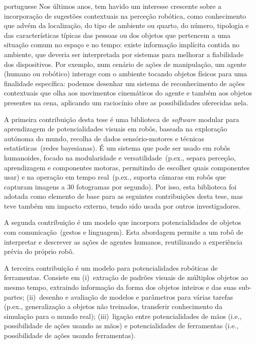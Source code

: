 \begin{otherlanguage*}{portuguese}
Nos últimos anos, tem havido um interesse crescente sobre a incorporação de sugestões contextuais na perceção robótica, como conhecimento que advém da localização, do tipo de ambiente ou quarto, do número, tipologia e das características típicas das pessoas ou dos objetos que pertencem a uma situação comum no espaço e no tempo: existe informação implícita contida no ambiente, que deveria ser interpretada por sistemas para melhorar a fiabilidade dos dispositivos.
Por exemplo, num cenário de ações de manipulação, um agente (humano ou robótico) interage com o ambiente tocando objetos físicos para uma finalidade específica: podemos desenhar um sistema de reconhecimento de ações contextuais que olha aos movimentos cinemáticos do agente e também aos objetos presentes na cena, aplicando um raciocínio obre as possibilidades oferecidas nela.

\bigskip

A primeira contribuição desta tese é uma biblioteca de \emph{software} modular para aprendizagem de potencialidades visuais em robôs, baseada na exploração autónoma do mundo, recolha de dados sensório-motores e técnicas estatísticas~(redes bayesianas).
É um sistema que pode ser usado em robôs humanoides, focado na modularidade e versatilidade~(p.ex., separa perceção, aprendizagem e componentes motoras, permitindo de escolher quais componentes usar) e na operação em tempo real~(p.ex., suporta câmaras em robôs que capturam imagens a 30 fotogramas por segundo).
Por isso, esta biblioteca foi adotada como elemento de base para as seguintes contribuições desta tese, mas teve também um impacto externo, tendo sido usada por outros investigadores.

A segunda contribuição é um modelo que incorpora potencialidades de objetos com comunicação~(gestos e linguagem).
Esta abordagem permite a um robô de interpretar e descrever as ações de agentes humanos, reutilizando a experiência prévia do próprio robô.

A terceira contribuição é um modelo para potencialidades robóticas de ferramentas.
Consiste em
(i)~extração de padrões visuais de múltiplos objetos ao mesmo tempo, extraindo informação da forma dos objetos inteiros e das suas sub-partes;
(ii)~desenho e avaliação de modelos e parâmetros para várias tarefas (p.ex., generalização a objetos não treinados, transferir conhecimento da simulação para o mundo real);
(iii)~ligação entre potencialidades de mãos (i.e., possibilidade de ações usando as mãos) e potencialidades de ferramentas (i.e., possibilidade de ações usando ferramentas).


\end{otherlanguage*}
